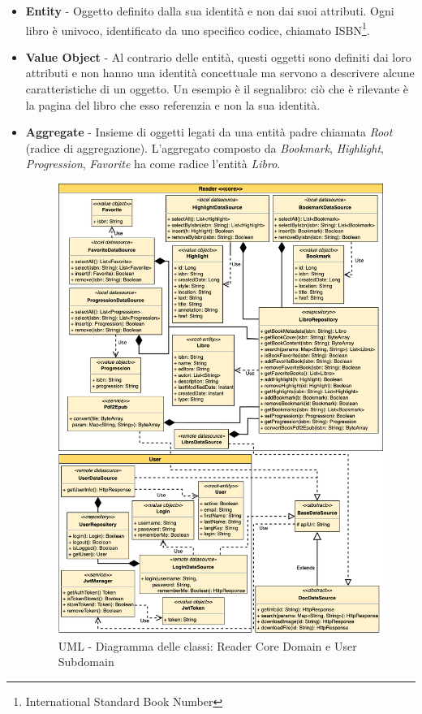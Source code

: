 \begin{itemize}
    \item \textbf{Entity} - Oggetto definito dalla sua identità e non dai suoi attributi. Ogni libro è univoco, identificato da uno specifico codice, chiamato ISBN\footnote{International Standard Book Number}.
    \item \textbf{Value Object} - Al contrario delle entità, questi oggetti sono definiti dai loro attributi e non hanno una identità concettuale ma servono a descrivere alcune caratteristiche di un oggetto. Un esempio è il segnalibro: ciò che è rilevante è la pagina del libro che esso referenzia e non la sua identità.
    \item \textbf{Aggregate} - Insieme di oggetti legati da una entità padre chiamata \textit{Root} (radice di aggregazione). L'aggregato composto da \textit{Bookmark}, \textit{Highlight}, \textit{Progression}, \textit{Favorite} ha come radice l'entità \textit{Libro}.

    \begin{figure}[H]
        \centering
        \includegraphics[width=1\textwidth]{img/class-uml-app.png}
        \caption{UML - Diagramma delle classi: Reader Core Domain e User Subdomain}
        \label{class-uml-app}
    \end{figure}


\end{itemize}
